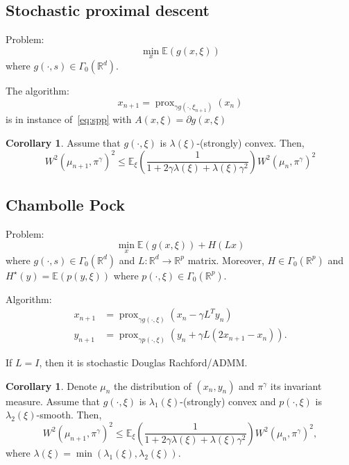 \documentclass{article}
\DeclareMathOperator{\prox}{prox}
\newcommand{\1}{\mathbbm 1}
\newcommand{\bE}{{{\mathbb E}}}
\newcommand{\bR}{{{\mathbb R}}}
\theoremstyle{definition}
\newtheorem{corollary}[theorem]{Corollary}
\begin{document}
\subsection{Stochastic proximal descent}

Problem:
\begin{equation}
    \min_x \bE(g(x,\xi))
\end{equation}
where $g(\cdot,s) \in \Gamma_0(\bR^d)$.

The algorithm:
\begin{equation}
\label{eq:spg}
    x_{n+1} = \prox_{\gamma g(\cdot,\xi_{n+1})}(x_n)
\end{equation}
is in instance of~\eqref{eq:spp} with $A(x,\xi) = \partial g(x,\xi)$

\begin{corollary}
Assume that $g(\cdot,\xi)$ is $\lambda(\xi)$-(strongly) convex. Then,
\begin{equation}
    W^2(\mu_{n+1},\pi^\gamma)^2 \leq \bE_\xi\left(\frac{1}{1+2\gamma\lambda(\xi)+\lambda(\xi)\gamma^2}\right) W^2(\mu_{n},\pi^\gamma)^2
\end{equation}
\end{corollary}


\subsection{Chambolle Pock}

Problem:
\begin{equation}
    \min_x \bE(g(x,\xi)) + H(Lx)
\end{equation}
where $g(\cdot,s) \in \Gamma_0(\bR^d)$ and $L : \bR^d \to \bR^p$ matrix. Moreover, $H \in \Gamma_0(\bR^p)$ and $H^\star(y) = \bE(p(y,\xi))$ where $p(\cdot,\xi) \in \Gamma_0(\bR^p)$.

Algorithm:
\begin{align}
    x_{n+1} &= \prox_{\gamma g(\cdot,\xi)}(x_n - \gamma L^{T} y_n)\\
    y_{n+1} &= \prox_{\gamma p(\cdot,\xi)}(y_n + \gamma L (2 x_{n+1} - x_n)).
\end{align}

If $L = I$, then it is stochastic Douglas Rachford/ADMM.



\begin{corollary}
Denote $\mu_n$ the distribution of $(x_n,y_n)$ and $\pi^\gamma$ its invariant measure. Assume that $g(\cdot,\xi)$ is $\lambda_1(\xi)$-(strongly) convex and $p(\cdot,\xi)$ is $\lambda_2(\xi)$-smooth. Then,
\begin{equation}
    W^2(\mu_{n+1},\pi^\gamma)^2 \leq \bE_\xi\left(\frac{1}{1+2\gamma\lambda(\xi)+\lambda(\xi)\gamma^2}\right) W^2(\mu_{n},\pi^\gamma)^2,
\end{equation}
where $\lambda(\xi) = \min(\lambda_1(\xi),\lambda_2(\xi)).$
\end{corollary}
\end{document}
